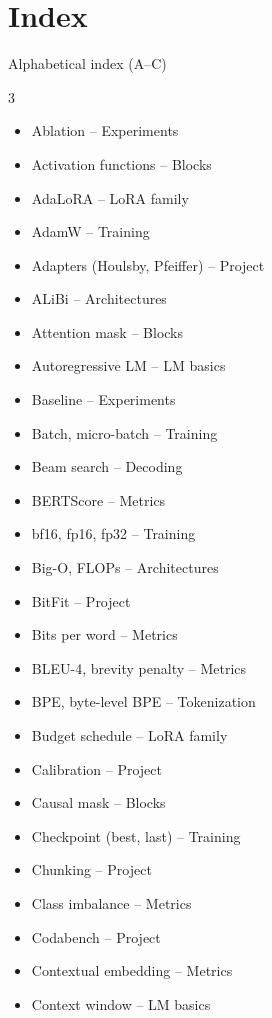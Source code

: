 \documentclass[aspectratio=169,11pt]{beamer}
\begin{document}
\section{Index}

\begin{frame}{Alphabetical index (A--C)}
  \footnotesize
  \begin{multicols}{3}
  \begin{itemize}\setlength{\itemsep}{0pt}
    \item Ablation -- Experiments
    \item Activation functions -- Blocks
    \item AdaLoRA -- LoRA family
    \item AdamW -- Training
    \item Adapters (Houlsby, Pfeiffer) -- Project
    \item ALiBi -- Architectures
    \item Attention mask -- Blocks
    \item Autoregressive LM -- LM basics
    \item Baseline -- Experiments
    \item Batch, micro-batch -- Training
    \item Beam search -- Decoding
    \item BERTScore -- Metrics
    \item bf16, fp16, fp32 -- Training
    \item Big-O, FLOPs -- Architectures
    \item BitFit -- Project
    \item Bits per word -- Metrics
    \item BLEU-4, brevity penalty -- Metrics
    \item BPE, byte-level BPE -- Tokenization
    \item Budget schedule -- LoRA family
    \item Calibration -- Project
    \item Causal mask -- Blocks
    \item Checkpoint (best, last) -- Training
    \item Chunking -- Project
    \item Class imbalance -- Metrics
    \item Codabench -- Project
    \item Contextual embedding -- Metrics
    \item Context window -- LM basics

\end{itemize}
\end{multicols}
\end{frame}
\end{document}
